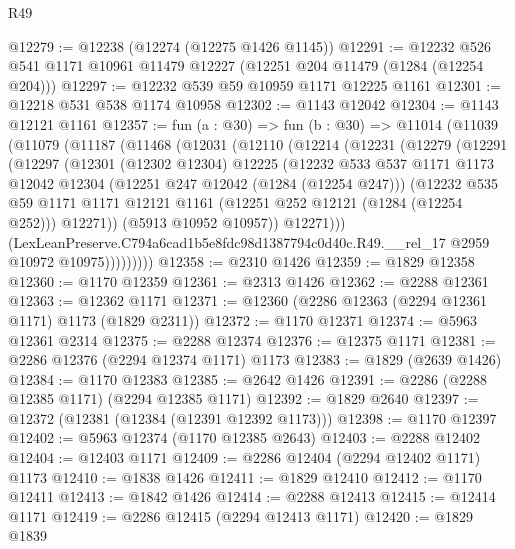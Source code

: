 \begin{lexlean}{R49}
\begin{coremodule}
@12279 := @12238 (@12274 (@12275 @1426 @1145))
@12291 := @12232 @526 @541 @1171 @10961 @11479 @12227 (@12251 @204 @11479 (@1284 (@12254 @204)))
@12297 := @12232 @539 @59 @10959 @1171 @12225 @1161
@12301 := @12218 @531 @538 @1174 @10958
@12302 := @1143 @12042
@12304 := @1143 @12121 @1161
@12357 := fun (a : @30) =>
  fun (b : @30) =>
  @11014
    (@11039
      (@11079
        (@11187
          (@11468
            (@12031
              (@12110
                (@12214
                  (@12231
                    (@12279
                      (@12291
                        (@12297
                          (@12301
                            (@12302 @12304)
                            @12225
                            (@12232
                              @533
                              @537
                              @1171
                              @1173
                              @12042
                              @12304
                              (@12251 @247 @12042 (@1284 (@12254 @247)))
                              (@12232
                                @535
                                @59
                                @1171
                                @1171
                                @12121
                                @1161
                                (@12251 @252 @12121 (@1284 (@12254 @252)))
                                @12271))
                            (@5913 @10952 @10957))
                          @12271)))
                    (LexLeanPreserve.C794a6cad1b5e8fdc98d1387794c0d40c.R49.__rel_17
                      @2959
                      @10972
                      @10975)))))))))
@12358 := @2310 @1426
@12359 := @1829 @12358
@12360 := @1170 @12359
@12361 := @2313 @1426
@12362 := @2288 @12361
@12363 := @12362 @1171
@12371 := @12360 (@2286 @12363 (@2294 @12361 @1171) @1173 (@1829 @2311))
@12372 := @1170 @12371
@12374 := @5963 @12361 @2314
@12375 := @2288 @12374
@12376 := @12375 @1171
@12381 := @2286 @12376 (@2294 @12374 @1171) @1173
@12383 := @1829 (@2639 @1426)
@12384 := @1170 @12383
@12385 := @2642 @1426
@12391 := @2286 (@2288 @12385 @1171) (@2294 @12385 @1171)
@12392 := @1829 @2640
@12397 := @12372 (@12381 (@12384 (@12391 @12392 @1173)))
@12398 := @1170 @12397
@12402 := @5963 @12374 (@1170 @12385 @2643)
@12403 := @2288 @12402
@12404 := @12403 @1171
@12409 := @2286 @12404 (@2294 @12402 @1171) @1173
@12410 := @1838 @1426
@12411 := @1829 @12410
@12412 := @1170 @12411
@12413 := @1842 @1426
@12414 := @2288 @12413
@12415 := @12414 @1171
@12419 := @2286 @12415 (@2294 @12413 @1171)
@12420 := @1829 @1839

\end{coremodule}
\end{lexlean}
